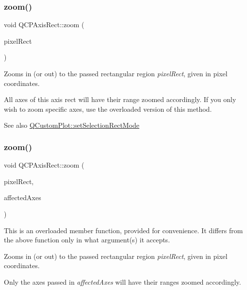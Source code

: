 \subsubsection{\texorpdfstring{zoom()}{zoom()}\hspace{0.1cm}{\footnotesize\ttfamily [1/2]}}
{\footnotesize\ttfamily void Q\+C\+P\+Axis\+Rect\+::zoom (\begin{DoxyParamCaption}\item[{const Q\+RectF \&}]{pixel\+Rect }\end{DoxyParamCaption})}

Zooms in (or out) to the passed rectangular region {\itshape pixel\+Rect}, given in pixel coordinates.

All axes of this axis rect will have their range zoomed accordingly. If you only wish to zoom specific axes, use the overloaded version of this method.

\begin{DoxySeeAlso}{See also}
\hyperlink{class_q_custom_plot_a810ef958ebe84db661c7288b526c0deb}{Q\+Custom\+Plot\+::set\+Selection\+Rect\+Mode} 
\end{DoxySeeAlso}
\mbox{\label{class_q_c_p_axis_rect_a6a39fb3aea60a8c503bdcb3f0477d2f6}} 
\subsubsection{\texorpdfstring{zoom()}{zoom()}\hspace{0.1cm}{\footnotesize\ttfamily [2/2]}}
{\footnotesize\ttfamily void Q\+C\+P\+Axis\+Rect\+::zoom (\begin{DoxyParamCaption}\item[{const Q\+RectF \&}]{pixel\+Rect,  }\item[{const Q\+List$<$ \hyperlink{class_q_c_p_axis}{Q\+C\+P\+Axis} $\ast$$>$ \&}]{affected\+Axes }\end{DoxyParamCaption})}

This is an overloaded member function, provided for convenience. It differs from the above function only in what argument(s) it accepts.

Zooms in (or out) to the passed rectangular region {\itshape pixel\+Rect}, given in pixel coordinates.

Only the axes passed in {\itshape affected\+Axes} will have their ranges zoomed accordingly.

